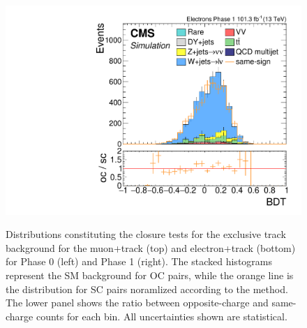 \begin{figure}[!htb]
\includegraphics[width=0.48\linewidth]{plots/track_electron_sc_comparison_phase1/none_exTrack_dilepBDTCorrJetNoMultIso10Dr0.5.pdf} \\
\caption[Exclusive track category closure tests]{Distributions constituting the closure tests for the exclusive track background for the muon+track (top) and electron+track (bottom) for Phase 0 (left) and Phase 1 (right). The stacked histograms represent the SM background for OC pairs, while the orange line is the distribution for SC pairs noramlized according to the method. The lower panel shows the ratio between opposite-charge and same-charge counts for each bin. All uncertainties shown are statistical.}
\label{fig:ex-track-closure-tests}
\end{figure}